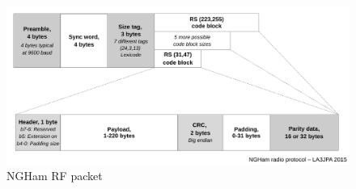 \documentclass[a4paper, english, 12pt, hidelinks]{article}
\begin{document}
    \begin{figure}[H]
	    \centering
	    \includegraphics[width = \textwidth, trim=0cm 0cm 0cm 0cm, clip]{img/ngham_block_v4.pdf}
	    \caption{NGHam RF packet}
	    \label{fig:ngham_rf_packet}
    \end{figure}
\end{document}
